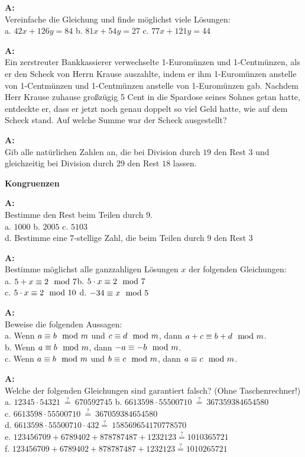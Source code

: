 \documentclass[landscape,twocolumn,a4paper]{article}
\begin{document}
 
 \textbf{A:}   \\
Vereinfache die Gleichung und finde möglichst viele Lösungen: \\
a.   $42x+126y=84$ \quad b. $81x+54y=27$ \quad 
 c. $77x+121y=44$ 
 \bigskip {}
 
 \textbf{A:}   \\
  Ein zerstreuter Bankkassierer verwechselte 1-Euromünzen und
  1-Centmünzen, als er den Scheck von Herrn Krause auszahlte, indem er
  ihm 1-Euromünzen anstelle von 1-Centmünzen und 1-Centmünzen anstelle
  von 1-Euromünzen gab. Nachdem Herr Krause zuhause großzügig 5 Cent
  in die Spardose seines Sohnes getan hatte, entdeckte er, dass er
  jetzt noch genau doppelt so viel Geld hatte, wie auf dem Scheck
  stand. Auf welche Summe war der Scheck ausgestellt?
 \bigskip {}
 
 \textbf{A:}   \\
  Gib alle natürlichen Zahlen an, die  bei Division durch
  $19$ den Rest $3$ und gleichzeitig bei Division durch $29$ den Rest
  $18$ lassen.
 \bigskip {}
 
 \textbf{Kongruenzen} \bigskip
 
\textbf{A:}   \\
Bestimme den Rest beim Teilen durch 9. \\
a. $1000$ \quad b.   $2005$ \quad  c. $5103$  \\
d.   Bestimme eine 7-stellige Zahl, die beim Teilen durch 9 den Rest 3
\bigskip {}

\textbf{A:}   \\
Bestimme möglichst alle ganzzahligen Lösungen $x$ der folgenden
  Gleichungen: \\
a. $5+x\equiv2\mod7$\quad b.   $5\cdot x\equiv2\mod7$ \\ 
c. $5\cdot x\equiv2\mod10$  \quad d.  $-34\equiv x\mod5$
\bigskip {}

\textbf{A:}   \\
Beweise die folgenden Aussagen:\\
a. Wenn $a\equiv b\mod m$ und $c\equiv d\mod m$, dann
    $a+c\equiv b+d\mod m$. \\
b. Wenn $a\equiv b\mod m$, dann $-a\equiv-b\mod m$. \\
c. Wenn $a\equiv b\mod m$ und $b\equiv c\mod m$, dann
    $a\equiv c\mod m$.
\bigskip {}

\textbf{A:}   \\
  Welche der folgenden Gleichungen sind garantiert falsch? (Ohne
  Taschenrechner!) \\
a. ${12345}\cdot{54321}\ \overset{?}{=}\ {670592745}$ \quad b.   $6613598\cdot55500710\ \overset{?}{=}\ 367359384654580$ \\
c. $6613598\cdot55500710\ \overset{?}{=}\ 367059384654580$ \\
d. $6613598\cdot55500710\cdot432 \overset{?}{=}\ 158569654170778570$ \\
e.  $123456709+6789402+878787487+1232123\overset{?}{=}1010365721$ \\
f. $123456709+6789402+878787487+1232123\overset{?}{=}1010265721$
\bigskip {}
\end{document}

